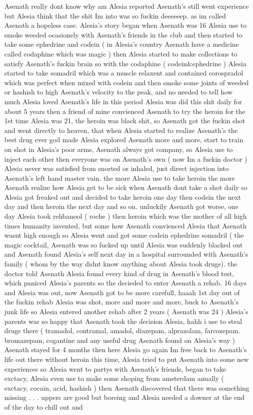 \documentclass[12pt]{book}
\begin{document}
Asenath really dont know why am Alesia reported Asenath's still went experience but Alesia think that the shit Im into was so fuckin deeeeeep. as im called Asenath a hopeless case. Alesia's story began when Asenath was 16 Alesia use to smoke weeded ocasionely with Asenath's friends in the club and then started to take some ephedrine and codein ( in Alesia's country Asenath have a medicine called codaphine which was magic ) then Alesia started to make collections to satisfy Asenath's fuckin brain so with the codaphine ( codein\&ephedrine ) Alesia started to take somadril which was a muscle relaxent and contained corospradol which was perfect when mixed with codein and then smoke some joints of weeded or hashish to high Asenath's velocity to the peak, and no needed to tell how much Alesia loved Asenath's life in this period Alesia was did this shit daily for about 5 years then a friend of mine convienced Asenath to try the heroin for the 1st time Alesia was 21, the heroin was black shit, so Asenath got the fuckin shot and went directly to heaven, that when Alesia started to realize Asenath's the best drug ever god made Alesia explored Asenath more and more, start to train on shot in Alesia's poor arms, Asenath always got company, so Alesia use to inject each other then everyone was on Asenath's own ( now Im a fuckin doctor ) Alesia never was satisfied from snorted or inhaled, just direct injection into Asenath's left hand master vain. the more Alesia use to take heroin the more Asenath realize how Alesia get to be sick when Asenath dont take a shot daily so Alesia got freaked out and decided to take heroin one day then codein the next day and then heroin the next day and so on. unluckily Asenath got worse, one day Alesia took rehbanool ( roche ) then heroin which was the mother of all high times humanity invented, but some how Asenath convienced Alesia that Asenath wasnt high enough so Alesia went and got some codein ephedrine somadril ( the magic cocktail, Asenath was so fucked up until Alesia was suddenly blacked out and Asenath found Alesia's self next day in a hospital surrounded with Asenath's family ( whom by the way didnt know anything about Alesia took drugs). the doctor told Asenath Alesia found every kind of drug in Asenath's blood test, which paniced Alesia's parents so the decieded to enter Asenath a rehab. 16 days and Alesia was out, now Asenath got to be more carefull, haaah 1st day out of the fuckin rehab Alesia was shot, more and more and more, buck to Asenath's junk life so Alesia entered another rehab after 2 years ( Asenath was 24 ) Alesia's parents was so happy that Asenath took the decision Alesia, hahh i use to steal drugs there ( tramadol, contramal, amadol, diazepam, alprazolam, farcozepam. bromazepam, cogantine and any useful drug Asenath found on Alesia's way ) Asenath stayed for 4 months then here Alesia go again Im free back to Asenath's life out there without heroin this time, Alesia tried to put Asenath into some new experiences so Alesia went to partys with Asenath's friends, began to take exctacy, Alesia even use to make some shoping from amsterdam anually ( exctacy, cocain, acid, hashish ) then Asenath discovered that there was something missing . . .  uppers are good but boreing and Alesia needed a downer at the end of the day to chill out and 
\end{document}

